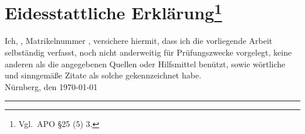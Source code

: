 \thispagestyle{empty}
\section*{Eidesstattliche Erklärung\footnote{\small Vgl.\ APO \S 25 (5) 3.}}

Ich, \autor, Matrikelnummer \matrikelnr, versichere hiermit, dass ich die vorliegende Arbeit selbständig verfasst, noch nicht anderweitig für Prüfungszwecke vorgelegt, keine anderen als die angegebenen Quellen oder Hilfsmittel benützt, sowie wörtliche und sinngemäße Zitate als solche gekennzeichnet habe.\\[6ex]

Nürnberg, den {\today}


\rule[-0.2cm]{6cm}{0.5pt}

\textsc{\autor}
